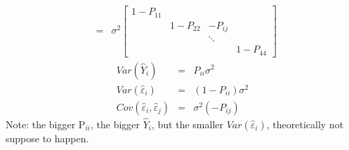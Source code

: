 \documentclass{article}
\begin{document}
\begin{itemize}
\begin{eqnarray*}
&=&\sigma ^{2}\left[ 
\begin{array}{cccc}
1-P_{11} &  &  &  \\ 
& 1-P_{22} & -P_{ij} &  \\ 
&  & \ddots &  \\ 
&  &  & 1-P_{44}%
\end{array}%
\right]
\end{eqnarray*}%
\begin{eqnarray*}
Var\left( \hat{Y}_{i}\right) &=&P_{ii}\sigma ^{2} \\
Var\left( \hat{\varepsilon}_{i}\right) &=&\left( 1-P_{ii}\right) \sigma ^{2}
\\
Cov\left( \hat{\varepsilon}_{i},\hat{\varepsilon}_{j}\right) &=&\sigma
^{2}\left( -P_{ij}\right)
\end{eqnarray*}%
Note: the bigger P$_{ii}$, the bigger $\hat{Y}_{i}$, but the smaller $%
Var\left( \hat{\varepsilon}_{i}\right) $, theoretically not suppose to
happen.
\end{itemize}

\bigskip
\end{document}
